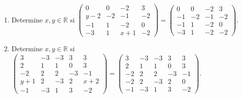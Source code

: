 \documentclass[12pt]{article}
\theoremstyle{remark}
\newcounter{contadorEjercicio}
\newenvironment{listaejercicios}{\begin{enumerate}[label=\textbf{E\arabic*.},leftmargin=2.4em,itemsep=0.52em]\setcounter{enumi}{\value{contadorEjercicio}}}{\setcounter{contadorEjercicio}{\value{enumi}}\end{enumerate}}
\begin{document}
\begin{listaejercicios}
\item Determine $x,y\in\mathbb R$ si $\begin{pmatrix}0&0&-2&3\\y - 2&-2&-1&-2\\-1&1&-2&0\\-3&1&x + 1&-2\end{pmatrix}=\begin{pmatrix}0&0&-2&3\\-1&-2&-1&-2\\-1&1&-2&0\\-3&1&-2&-2\end{pmatrix}$.

\item Determine $x,y\in\mathbb R$ si $\begin{pmatrix}3&-3&-3&3&3\\2&1&1&0&3\\-2&2&2&-3&-1\\y + 1&2&-3&2&x + 2\\-1&-3&1&3&-2\end{pmatrix}=\begin{pmatrix}3&-3&-3&3&3\\2&1&1&0&3\\-2&2&2&-3&-1\\-2&2&-3&2&0\\-1&-3&1&3&-2\end{pmatrix}$.

\end{listaejercicios}
\end{document}
